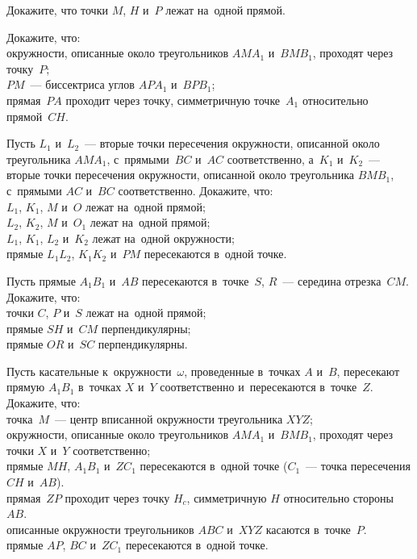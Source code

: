 \begin{problems}

\item
Докажите, что точки $M$, $H$ и~$P$ лежат на~одной прямой.

\item
Докажите, что:
\\
\subproblem
окружности, описанные около треугольников $A M A_1$ и~$B M B_1$, проходят через
точку~$P$;
\\
\subproblem
$PM$~--- биссектриса углов $A P A_1$ и~$B P B_1$;
\\
\subproblem
прямая~$PA$ проходит через точку, симметричную точке~$A_1$ относительно
прямой~$CH$.

\item
Пусть $L_1$ и~$L_2$~--- вторые точки пересечения окружности, описанной около
треугольника $A M A_1$, с~прямыми~$BC$ и~$AC$ соответственно,
а~$K_1$ и~$K_2$~--- вторые точки пересечения окружности, описанной около
треугольника $B M B_1$, с~прямыми $AC$ и~$BC$ соответственно.
Докажите, что:
\\
\subproblem $L_1$, $K_1$, $M$ и~$O$ лежат на~одной прямой;
\\
\subproblem $L_2$, $K_2$, $M$ и~$O_1$ лежат на~одной прямой;
\\
\subproblem $L_1$, $K_1$, $L_2$ и~$K_2$ лежат на~одной окружности;
\\
\subproblem прямые $L_1 L_2$, $K_1 K_2$ и~$PM$ пересекаются в~одной точке.

\item
Пусть прямые $A_1 B_1$ и~$AB$ пересекаются в~точке~$S$, $R$~--- середина
отрезка~$CM$.
Докажите, что:
\\
\subproblem точки $C$, $P$ и~$S$ лежат на~одной прямой;
\\
\subproblem прямые $SH$ и~$CM$ перпендикулярны;
\\
\subproblem прямые $OR$ и~$SC$ перпендикулярны.

\item
Пусть касательные к~окружности~$\omega$, проведенные в~точках $A$ и~$B$,
пересекают прямую $A_1 B_1$ в~точках $X$ и~$Y$ соответственно и~пересекаются
в~точке~$Z$.
Докажите, что:
\\
\subproblem
точка~$M$~--- центр вписанной окружности треугольника $XYZ$;
\\
\subproblem
окружности, описанные около треугольников $A M A_1$ и~$B M B_1$, проходят через
точки $X$ и~$Y$ соответственно;
\\
\subproblem
прямые $MH$, $A_1 B_1$ и~$Z C_1$ пересекаются в~одной точке
($C_1$~--- точка пересечения $CH$ и~$AB$).
\\
\subproblem
прямая~$ZP$ проходит через точку $H_{c}$, симметричную $H$ относительно
стороны~$AB$.
\\
\subproblem
описанные окружности треугольников $ABC$ и~$XYZ$ касаются в~точке~$P$.
\\
\subproblem
прямые $AP$, $BC$ и~$Z C_1$ пересекаются в~одной точке.

\end{problems}


